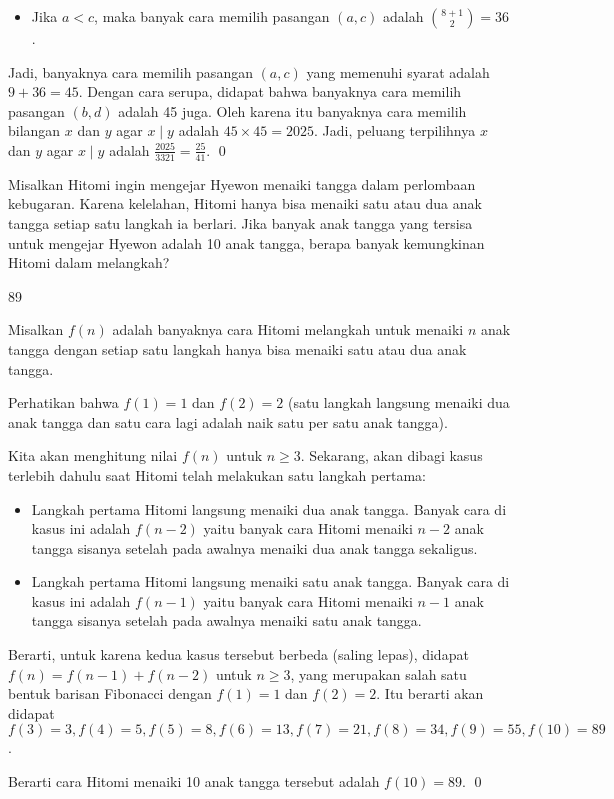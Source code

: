 \documentclass[11pt]{scrartcl}
\begin{document}
\begin{soalbaru}
\begin{solusi}
\begin{itemize}
		\item Jika $a < c$, maka banyak cara memilih pasangan $(a,c)$ adalah ${8+1 \choose 2} = 36$.
		\end{itemize}
		
		Jadi, banyaknya cara memilih pasangan $(a,c)$ yang memenuhi syarat adalah $9+36=45$. Dengan cara serupa, didapat bahwa banyaknya cara memilih pasangan $(b,d)$ adalah 45 juga. Oleh karena itu banyaknya cara memilih bilangan $x$ dan $y$ agar $x \mid y$ adalah $45 \times 45 = 2025$. Jadi, peluang terpilihnya $x$ dan $y$ agar $x \mid y$ adalah $\frac{2025}{3321}=\frac{25}{41}$. \qed
		\end{solusi}
	\end{soalbaru}
	
	\begin{soalbaru}
		Misalkan Hitomi ingin mengejar Hyewon menaiki tangga dalam perlombaan kebugaran. Karena kelelahan, Hitomi hanya bisa menaiki satu atau dua anak tangga setiap satu langkah ia berlari. Jika banyak anak tangga yang tersisa untuk mengejar Hyewon adalah 10 anak tangga, berapa banyak kemungkinan Hitomi dalam melangkah?
		
		\begin{jawaban}
		89
		\end{jawaban}
		\begin{solusi}
		Misalkan $f(n)$ adalah banyaknya cara Hitomi melangkah untuk menaiki $n$ anak tangga dengan setiap satu langkah hanya bisa menaiki satu atau dua anak tangga.
		
		Perhatikan bahwa $f(1)=1$ dan $f(2)=2$ (satu langkah langsung menaiki dua anak tangga dan satu cara lagi adalah naik satu per satu anak tangga).
		
		Kita akan menghitung nilai $f(n)$ untuk $n \ge 3$. Sekarang, akan dibagi kasus terlebih dahulu saat Hitomi telah melakukan satu langkah pertama:
		\begin{itemize}
		\item Langkah pertama Hitomi langsung menaiki dua anak tangga. Banyak cara di kasus ini adalah $f(n-2)$ yaitu banyak cara Hitomi menaiki $n-2$ anak tangga sisanya setelah pada awalnya menaiki dua anak tangga sekaligus.
		
		\item Langkah pertama Hitomi langsung menaiki satu anak tangga. Banyak cara di kasus ini adalah $f(n-1)$ yaitu banyak cara Hitomi menaiki $n-1$ anak tangga sisanya setelah pada awalnya menaiki satu anak tangga.
		\end{itemize}
		
		Berarti, untuk karena kedua kasus tersebut berbeda (saling lepas), didapat $f(n)=f(n-1)+f(n-2)$ untuk $n \ge 3$, yang merupakan salah satu bentuk barisan Fibonacci dengan $f(1)=1$ dan $f(2)=2$. Itu berarti akan didapat $f(3)=3,f(4)=5,f(5)=8,f(6)=13,f(7)=21,f(8)=34,f(9)=55,f(10)=89$.
		
		Berarti cara Hitomi menaiki 10 anak tangga tersebut adalah $f(10)=89$. \qed
		\end{solusi}
	\end{soalbaru}
	
\end{document}

